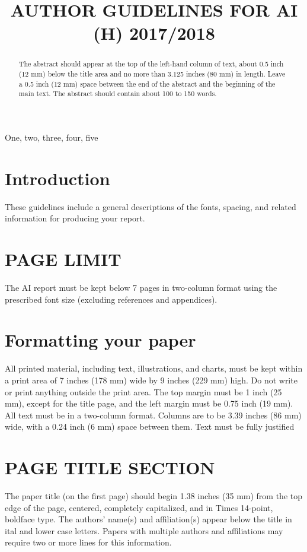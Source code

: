 \documentclass{article}
\title{AUTHOR GUIDELINES FOR AI (H) 2017/2018}
\begin{document}
\maketitle
%
\begin{abstract}
The abstract should appear at the top of the left-hand column of text, about
0.5 inch (12 mm) below the title area and no more than 3.125 inches (80 mm) in
length.  Leave a 0.5 inch (12 mm) space between the end of the abstract and the
beginning of the main text.  The abstract should contain about 100 to 150
words.
\end{abstract}
%
\begin{keywords}
One, two, three, four, five
\end{keywords}
%
\section{Introduction}
\label{sec:intro}

These guidelines include a general descriptions of the fonts, spacing, and
related information for producing your report. 

\section{PAGE LIMIT}
\label{sec:pagestyle}
The AI report must be kept below 7 pages in two-column format using the prescribed font size (excluding references and appendices).

\section{Formatting your paper}
\label{sec:format}

All printed material, including text, illustrations, and charts, must be kept within a print area of 7 inches (178 mm) wide by 9 inches (229 mm) high. Do not write or print anything outside the print area. The top margin must be 1 inch (25 mm), except for the title page, and the left margin must be 0.75 inch (19 mm).  All text must be in a two-column format. Columns are to be 3.39 inches (86 mm) wide, with a 0.24 inch (6 mm) space between them. Text must be fully justified

\section{PAGE TITLE SECTION}
\label{sec:pagestyle}

The paper title (on the first page) should begin 1.38 inches (35 mm) from the top edge of the page, centered, completely capitalized, and in Times 14-point, boldface type.  The authors’ name(s) and affiliation(s) appear below the title in ital and lower case letters.  Papers with multiple authors and affiliations may require two or more lines for this information.
\end{document}
